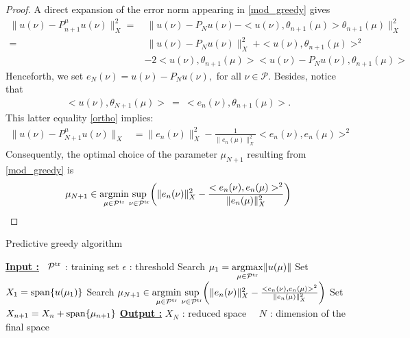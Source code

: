 \documentclass[12pt,a4paper]{article}
\newcommand{\Ptr}{\mathcal P^{\rm tr}}
\newcommand{\tr}{{\rm tr}}
\newcommand{\calP}{\mathcal P}
\begin{document}
\begin{proof}
A direct expansion of the error norm appearing in \eqref{mod_greedy} gives
  \begin{align*}
   \|u(\nu)- P^\mu_{n+1} u(\nu)\|^2_X  =& \ \|u(\nu)-P_N u(\nu)-<u(\nu),\theta_{n+1}(\mu)>\theta_{n+1}(\mu)\|^2_X \\
 =&\ \|u(\nu)-P_N u(\nu)\|_X^2 \ + <u(\nu),\theta_{n+1}(\mu)>^2  \\
 &- 2 <u(\nu),\theta_{n+1}(\mu)><u(\nu)-P_N u(\nu),\theta_{n+1}(\mu) > 
  \end{align*}
Henceforth, we set $e_N(\nu) = u(\nu)-P_N u(\nu),$ for all $\nu \in \mathcal P$. Besides, notice that
 \begin{align}\label{ortho}
  <u(\nu),\theta_{N+1}(\mu)>\ =\ <e_n(\nu),\theta_{n+1}(\mu)>.
 \end{align}
This latter equality \eqref{ortho} implies:
 \begin{align}\label{err_est}
 \|u(\nu)- P^\mu_{N+1} u(\nu)\|_X   &= \|e_n(\nu)\|_X^2 -\frac{1}{\|e_n(\mu)\|_X^2} <e_n(\nu), e_n(\mu)>^2 
   \end{align}
 Consequently, the optimal choice of the parameter $\mu_{N+1}$ resulting from \eqref{mod_greedy} is 
\begin{equation*}
  \mu_{N+1} \in \underset{\mu \in \calP^\tr}{\mathrm{argmin}}
  \underset{\nu \in \calP^\tr} {\mathrm{\ sup\ }}
  \bigg( \|e_n(\nu)\|_X^2 -\frac{<e_n(\nu), e_n(\mu)>^2}{\|e_n(\mu)\|_X^2} \bigg)
 \end{equation*}
 \end{proof}
 
 \begin{algorithm}[H]
\caption{Predictive greedy algorithm}\label{alg:predictive}
\begin{algorithmic}[1]
\Statex \textbf{\underline{Input :}}
\ $\Ptr$ : training set
\Statex\qquad\qquad $\epsilon$ : threshold
\State Search $\mu_1 = \underset{\mu\in\Ptr}{\rm argmax}\|u(\mu)\|$
\State Set $X_1 = {\rm span}\{u(\mu_1)\}$
\While{ $>\epsilon$}
\State Search $ \mu_{N+1} \in \underset{\mu \in \calP^\tr}{\mathrm{argmin}}
  \underset{\nu \in \calP^\tr} {\mathrm{\ sup\ }}
  \bigg( \|e_n(\nu)\|_X^2 -\frac{<e_n(\nu), e_n(\mu)>^2}{\|e_n(\mu)\|_X^2} \bigg)$
\State Set $X_{n+1} = X_n + {\rm span}\{\mu_{n+1}\}$
\EndWhile
\Statex \textbf{\underline {Output :}}
$X_N$ : reduced space
\Statex \qquad\qquad\ \ ${N}$ : dimension of the final space
\vspace{0.2cm}
\end{algorithmic}
\end{algorithm}
\end{document}
